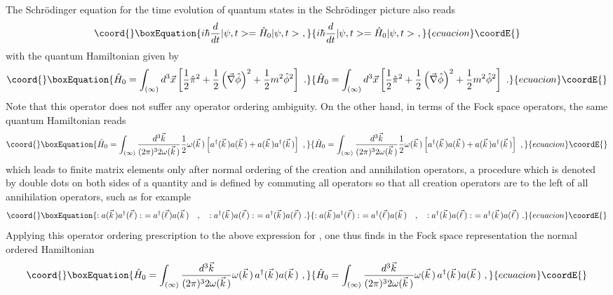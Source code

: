 \documentclass[a4paper,11pt]{article}
\begin{document}
The Schr\"odinger equation for the time evolution of quantum states in the
Schr\"odinger picture also reads
\begin{equation}\coord{}\boxEquation{
i\hbar\frac{d}{dt}|\psi,t>=\hat{H}_0|\psi,t>\ ,
}{
i\hbar\frac{d}{dt}|\psi,t>=\hat{H}_0|\psi,t>\ ,
}{ecuacion}\coordE{}\end{equation}
with the quantum Hamiltonian given by
\begin{equation}\coord{}\boxEquation{
\hat{H}_0=\int_{(\infty)}d^3\vec{x}\left[
\frac{1}{2}\hat{\pi}^2+\frac{1}{2}\left(\vec{\nabla}\hat{\phi}\right)^2+
\frac{1}{2}m^2\hat{\phi}^2\right]\ .
}{
\hat{H}_0=\int_{(\infty)}d^3\vec{x}\left[
\frac{1}{2}\hat{\pi}^2+\frac{1}{2}\left(\vec{\nabla}\hat{\phi}\right)^2+
\frac{1}{2}m^2\hat{\phi}^2\right]\ .
}{ecuacion}\coordE{}\end{equation}
Note that this operator does not suffer any operator ordering ambiguity.
On the other hand, in terms of the Fock space operators, the same
quantum Hamiltonian reads
\begin{equation}\coord{}\boxEquation{
\hat{H}_0=\int_{(\infty)}\frac{d^3\vec{k}}{(2\pi)^32\omega(\vec{k}\,)}
\frac{1}{2}\omega(\vec{k}\,)\left[a^\dagger(\vec{k}\,)a(\vec{k}\,)+
a(\vec{k}\,)a^\dagger(\vec{k}\,)\right]\ ,
}{
\hat{H}_0=\int_{(\infty)}\frac{d^3\vec{k}}{(2\pi)^32\omega(\vec{k}\,)}
\frac{1}{2}\omega(\vec{k}\,)\left[a^\dagger(\vec{k}\,)a(\vec{k}\,)+
a(\vec{k}\,)a^\dagger(\vec{k}\,)\right]\ ,
}{ecuacion}\coordE{}\end{equation}
which leads to finite matrix elements only after normal ordering
of the creation and annihilation operators, a procedure which is denoted by 
double dots on both sides of a quantity and is defined by
commuting all operators so that all creation operators are to the left
of all annihilation operators, such as for example
\begin{equation}\coord{}\boxEquation{
:a(\vec{k}\,)a^\dagger(\vec{\ell}\,):\ =a^\dagger(\vec{\ell}\,)a(\vec{k}\,)
\ \ \ ,\ \ \ 
:a^\dagger(\vec{k}\,)a(\vec{\ell}\,):\ =a^\dagger(\vec{k}\,)a(\vec{\ell}\,)\ .
}{
:a(\vec{k}\,)a^\dagger(\vec{\ell}\,):\ =a^\dagger(\vec{\ell}\,)a(\vec{k}\,)
\ \ \ ,\ \ \ 
:a^\dagger(\vec{k}\,)a(\vec{\ell}\,):\ =a^\dagger(\vec{k}\,)a(\vec{\ell}\,)\ .
}{ecuacion}\coordE{}\end{equation}
Applying this operator ordering prescription to the above expression
for \myHighlight{$\hat{H}_0$}\coordHE{}, one thus finds in the Fock space representation the
normal ordered Hamiltonian
\begin{equation}\coord{}\boxEquation{
\hat{H}_0=\int_{(\infty)}\frac{d^3\vec{k}}{(2\pi)^32\omega(\vec{k}\,)}
\omega(\vec{k}\,)\,a^\dagger(\vec{k}\,)a(\vec{k}\,)\ ,
\label{eq:normalorderedH0}
}{
\hat{H}_0=\int_{(\infty)}\frac{d^3\vec{k}}{(2\pi)^32\omega(\vec{k}\,)}
\omega(\vec{k}\,)\,a^\dagger(\vec{k}\,)a(\vec{k}\,)\ ,
}{ecuacion}\coordE{}\end{equation}
\end{document}
